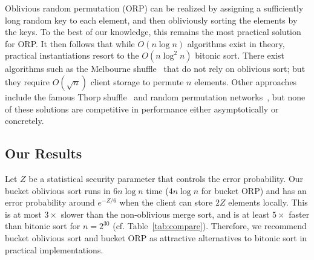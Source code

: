 Oblivious random permutation (ORP) can be realized by assigning a sufficiently long random key to each element, and then obliviously sorting the elements by the keys.
To the best of our knowledge, this remains the most practical solution for ORP.
It then follows that while $O(n \log n)$ algorithms exist in theory, practical instantiations resort to the $O(n \log^2 n)$ bitonic sort.
There exist algorithms such as the Melbourne
shuffle~\cite{ohrimenko2014melbourne} that do not rely on
oblivious sort; but they require $O(\sqrt{n})$ client storage to permute $n$ elements.
Other approaches include the famous Thorp shuffle~\cite{thorp01} and random permutation networks~\cite{randpermnet}, but none of these solutions are competitive in performance either asymptotically or concretely.

\subsection{Our Results}
Let $Z$ be a statistical security parameter that controls the error probability. 
Our bucket oblivious sort runs in $6n\log n$ time ($4n\log n$ for bucket ORP) and has an error probability around $e^{-Z/6}$ when the client can store $2Z$ elements locally.
This is at most $3\times$ slower than the non-oblivious merge sort, and is at least $5\times$ faster than bitonic sort for $n=2^{30}$ (cf. Table~\ref{tab:compare}).
Therefore, we recommend bucket oblivious sort and bucket ORP as attractive alternatives to bitonic sort in practical implementations.

